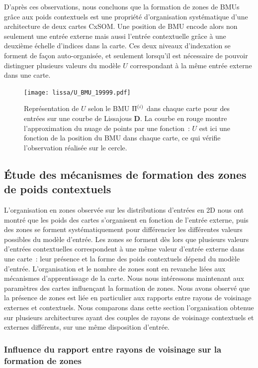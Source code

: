 \documentclass[../main]{subfiles}
\begin{document}
D'après ces observations, nous concluons que la formation de zones de BMUs grâce aux poids contextuels est une propriété d'organisation systématique d'une architecture de deux cartes CxSOM. Une position de BMU encode alors non seulement une entrée externe mais aussi l'entrée contextuelle grâce à une deuxième échelle d'indices dans la carte. Ces deux niveaux d'indexation se forment de façon auto-organisée, et seulement lorsqu'il est nécessaire de pouvoir distinguer plusieurs valeurs du modèle $U$ correspondant à la même entrée externe dans une carte.


\begin{figure}[t]
	\centering\texttt{[image: lissa/U\_BMU\_19999.pdf]}
	\caption{Représentation de $U$ selon le BMU $\Pi^{({i})}$ dans chaque carte pour des entrées sur une courbe de Lissajous \textbf{D}. La courbe en rouge montre l'approximation du nuage de points par une fonction~: $U$ est ici une fonction de la position du BMU dans chaque carte, ce qui vérifie l'observation réalisée sur le cercle.\label{fig:u_bmu_lissa}}
\end{figure}

\subsection{\'Etude des mécanismes de formation des zones de poids contextuels}

L'organisation en zones observée sur les distributions d'entrées en 2D nous ont montré que les poids des cartes s'organisent en fonction de l'entrée externe, puis des zones se forment systématiquement pour différencier les différentes valeurs possibles du modèle d'entrée. Les zones se forment dès lors que plusieurs valeurs d'entrées contextuelles correspondent à une même valeur d'entrée externe dans une carte~: leur présence et la forme des poids contextuels dépend du modèle d'entrée.
L'organisation et le nombre de zones sont en revanche liées aux mécanismes d'apprentissage de la carte.
Nous nous intéressons maintenant aux paramètres des cartes influençant la formation de zones.
Nous avons observé que la présence de zones est liée en particulier aux rapports entre rayons de voisinage externes et contextuels.
Nous comparons dans cette section l'organisation obtenue sur plusieurs architectures ayant des couples de rayons de voisinage contextuels et externes différents, sur une même disposition d'entrée.

\subsubsection{Influence du rapport entre rayons de voisinage sur la formation de zones}
\end{document}
